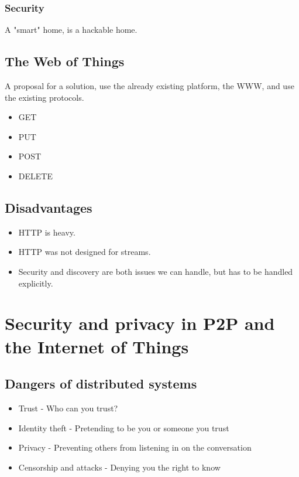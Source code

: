 	\subsection{Security}
	A "smart" home, is a hackable home.
	
	\section{The Web of Things}
	A proposal for a solution, use the already existing platform, the \gls{WWW}, and use the existing protocols.
	
	\begin{itemize}
		\item GET
		\item PUT
		\item POST
		\item DELETE
	\end{itemize}
	
	\section{Disadvantages}
	\begin{itemize}
		\item HTTP is heavy.
		\item HTTP was not designed for streams.
		\item Security and discovery are both issues we can handle, but has to be handled explicitly.
	\end{itemize}
	
	\chapter{Security and privacy in P2P and the Internet of Things}
	
	\section{Dangers of distributed systems}
	\begin{itemize}
		\item Trust - Who can you trust?
		\item Identity theft - Pretending to be you or someone you trust
		\item Privacy - Preventing others from listening in on the conversation
		\item Censorship and attacks - Denying you the right to know
	\end{itemize}
	
